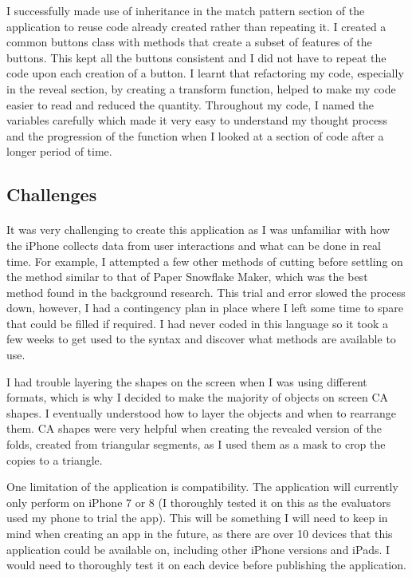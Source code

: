 \documentclass[11pt]{article}
\begin{document}
        I successfully made use of inheritance in the match pattern section of the application to reuse code already created rather than repeating it. I created a common buttons class with methods that create a subset of features of the buttons. This kept all the buttons consistent and I did not have to repeat the code upon each creation of a button. I learnt that refactoring my code, especially in the reveal section, by creating a transform function, helped to make my code easier to read and reduced the quantity. Throughout my code, I named the variables carefully which made it very easy to understand my thought process and the progression of the function when I looked at a section of code after a longer period of time. 
        
    \subsection{Challenges}
    
        \paragraph{}
        It was very challenging to create this application as I was unfamiliar with how the iPhone collects data from user interactions and what can be done in real time. For example, I attempted a few other methods of cutting before settling on the method similar to that of Paper Snowflake Maker, which was the best method found in the background research. This trial and error slowed the process down, however, I had a contingency plan in place where I left some time to spare that could be filled if required. I had never coded in this language so it took a few weeks to get used to the syntax and discover what methods are available to use.
        
        I had trouble layering the shapes on the screen when I was using different formats, which is why I decided to make the majority of objects on screen CA shapes. I eventually understood how to layer the objects and when to rearrange them. CA shapes were very helpful when creating the revealed version of the folds, created from triangular segments, as I used them as a mask to crop the copies to a triangle.
        
        One limitation of the application is compatibility. The application will currently only perform on iPhone 7 or 8 (I thoroughly tested it on this as the evaluators used my phone to trial the app). This will be something I will need to keep in mind when creating an app in the future, as there are over 10 devices that this application could be available on, including other iPhone versions and iPads. I would need to thoroughly test it on each device before publishing the application. 
            
\end{document}
